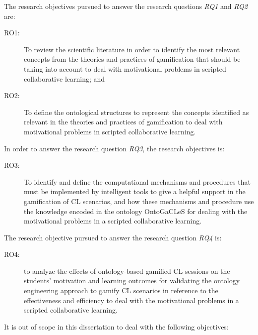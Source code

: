 The research objectives pursued to answer the research questions \emph{RQ1} and \emph{RQ2} are:

\begin{description}
\item[RO1:]
To review the scientific literature in order to identify the most relevant concepts from the theories and practices of gamification that should be taking into account to deal with motivational problems in scripted collaborative learning; and

\item[RO2:]
To define the ontological structures to represent the concepts identified as relevant in the theories and practices of gamification to deal with motivational problems in scripted collaborative learning.
\end{description}


In order to answer the research question \emph{RQ3}, the research objectives is:

\begin{description}
\item[RO3:]
To identify and define the computational mechanisms and procedures that must be implemented by intelligent tools to give a helpful support in the gamification of CL scenarios, and how these mechanisms and procedure use the knowledge encoded in the ontology OntoGaCLeS for dealing with the motivational problems in a scripted collaborative learning.
\end{description}

The research objective pursued to answer the research question \emph{RQ4} is:

\begin{description}
\item[RO4:]
to analyze the effects of ontology-based gamified CL sessions on the students’ motivation and learning outcomes for validating the ontology engineering approach to gamify CL scenarios in reference to the effectiveness and efficiency to deal with the motivational problems in a scripted collaborative learning.
\end{description}

It is out of scope in this dissertation to deal with the following objectives:

